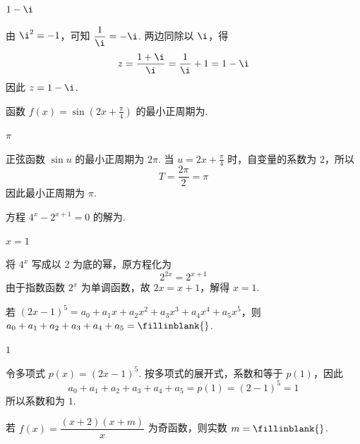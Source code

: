 \begin{answer}
\(1-\i\)
\end{answer}

\begin{solution}
由 \(\i^2=-1\)，可知 \(\dfrac{1}{\i}=-\i\). 两边同除以 \(\i\)，得
\[
z=\frac{1+\i}{\i}=\frac{1}{\i}+1=1-\i
\]
因此 \(z=1-\i\).
\end{solution}

\begin{problem}
函数 \(f(x)=\sin\left(2x+\frac{\pi}{4}\right)\) 的最小正周期为\fillinblank{}.
\end{problem}

\begin{answer}
\(\pi\)
\end{answer}

\begin{solution}
正弦函数 \(\sin u\) 的最小正周期为 \(2\pi\). 当 \(u=2x+\frac{\pi}{4}\) 时，自变量的系数为 \(2\)，所以
\[
T=\frac{2\pi}{2}=\pi
\]
因此最小正周期为 \(\pi\).
\end{solution}

\begin{problem}
方程 \(4^x-2^{x+1}=0\) 的解为\fillinblank{}.
\end{problem}

\begin{answer}
\(x=1\)
\end{answer}

\begin{solution}
将 \(4^x\) 写成以 \(2\) 为底的幂，原方程化为
\[
2^{2x}=2^{x+1}
\]
由于指数函数 \(2^x\) 为单调函数，故 \(2x=x+1\)，解得 \(x=1\).
\end{solution}

\begin{problem}
若 \((2x-1)^5=a_0+a_1x+a_2x^2+a_3x^3+a_4x^4+a_5x^5\)，则 \(a_0+a_1+a_2+a_3+a_4+a_5=\fillinblank{}\).
\end{problem}

\begin{answer}
\(1\)
\end{answer}

\begin{solution}
令多项式 \(p(x)=(2x-1)^5\). 按多项式的展开式，系数和等于 \(p(1)\)，因此
\[
a_0+a_1+a_2+a_3+a_4+a_5=p(1)=(2-1)^5=1
\]
所以系数和为 \(1\).
\end{solution}

\begin{problem}
若 \(f(x)=\dfrac{(x+2)(x+m)}{x}\) 为奇函数，则实数 \(m=\fillinblank{}\).
\end{problem}

